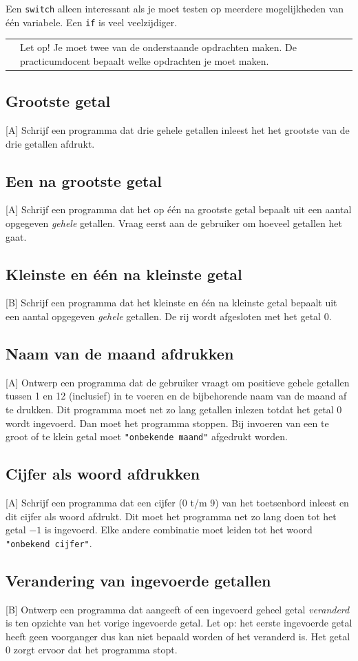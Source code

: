 \documentclass[a4paper,10pt,fleqn,twoside]{article}
\newcommand{\letop}{%
\vspace{4ex plus 1ex minus 1ex}
\begin{mdframed}[outerlinewidth = 1 ,%
roundcorner = 4 pt,%
leftmargin = 40,%
rightmargin = 40,%
backgroundcolor = yellow!40,%
outerlinecolor = red!70!black,%
innertopmargin = \topskip,%
splittopskip = \topskip,%
]
\begin{tabularx}{\linewidth}{m{1cm}X}
\Large\leftpointright & Let op! Je moet twee van de onderstaande opdrachten maken. De practicumdocent bepaalt welke opdrachten je moet maken.
\end{tabularx}
\end{mdframed}
\vspace{4ex plus 1ex minus 1ex}
}
\begin{document}
Een \lstinline|switch| alleen interessant als je moet testen op meerdere mogelijkheden van één variabele. Een \lstinline|if| is veel veelzijdiger.
 
\letop
\clearpage

\subsection{Grootste getal}[A]
Schrijf een programma dat drie gehele getallen inleest het het grootste van de drie getallen afdrukt. 

\subsection{Een na grootste getal}[A]
Schrijf een programma dat het op één na grootste getal bepaalt uit een aantal opgegeven \textsl{gehele} getallen. Vraag eerst aan de gebruiker om hoeveel getallen het gaat.

\subsection{Kleinste en één na kleinste getal}[B]
Schrijf een programma dat het kleinste en één na kleinste getal bepaalt uit een aantal opgegeven \textsl{gehele} getallen. De rij wordt afgesloten met het getal 0.

\subsection{Naam van de maand afdrukken}[A]
Ontwerp een programma dat de gebruiker vraagt om positieve gehele getallen tussen 1 en 12 (inclusief) in te voeren en de bijbehorende naam van de maand af te drukken. Dit programma moet net zo lang getallen inlezen totdat het getal 0 wordt ingevoerd. Dan moet het programma stoppen. Bij invoeren van een te groot of te klein getal moet \lstinline|"onbekende maand"| afgedrukt worden. 
 
\subsection{Cijfer als woord afdrukken}[A]
Schrijf een programma dat een cijfer (0 t/m 9) van het toetsenbord inleest en dit cijfer als woord afdrukt. Dit moet het programma net zo lang doen tot het getal $-1$ is ingevoerd. Elke andere combinatie moet leiden tot het woord \lstinline|"onbekend cijfer"|.
 
\subsection{Verandering van ingevoerde getallen}[B]
Ontwerp een programma dat aangeeft of een ingevoerd geheel getal \textsl{veranderd} is ten opzichte van het vorige ingevoerde getal. Let op: het eerste ingevoerde getal heeft geen voorganger dus kan niet bepaald worden of het veranderd is. Het getal 0 zorgt ervoor dat het programma stopt.
\end{document}
